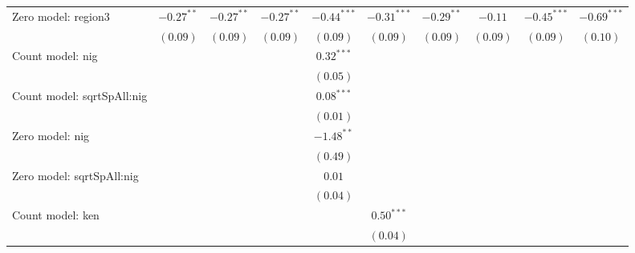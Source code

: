 \begin{table}
\begin{center}
{\begin{tabular}{l c c c c c c c c c}
Zero model: region3            & $-0.27^{**}$   & $-0.27^{**}$   & $-0.27^{**}$  & $-0.44^{***}$ & $-0.31^{***}$ & $-0.29^{**}$    & $-0.11$       & $-0.45^{***}$ & $-0.69^{***}$   \\
                               & $(0.09)$       & $(0.09)$       & $(0.09)$      & $(0.09)$      & $(0.09)$      & $(0.09)$        & $(0.09)$      & $(0.09)$      & $(0.10)$        \\
Count model: nig               &                &                &               & $0.32^{***}$  &               &                 &               &               &                 \\
                               &                &                &               & $(0.05)$      &               &                 &               &               &                 \\
Count model: sqrtSpAll:nig     &                &                &               & $0.08^{***}$  &               &                 &               &               &                 \\
                               &                &                &               & $(0.01)$      &               &                 &               &               &                 \\
Zero model: nig                &                &                &               & $-1.48^{**}$  &               &                 &               &               &                 \\
                               &                &                &               & $(0.49)$      &               &                 &               &               &                 \\
Zero model: sqrtSpAll:nig      &                &                &               & $0.01$        &               &                 &               &               &                 \\
                               &                &                &               & $(0.04)$      &               &                 &               &               &                 \\
Count model: ken               &                &                &               &               & $0.50^{***}$  &                 &               &               &                 \\
                               &                &                &               &               & $(0.04)$      &                 &               &               &                 \\

\end{tabular}}
\end{center}
\end{table}
